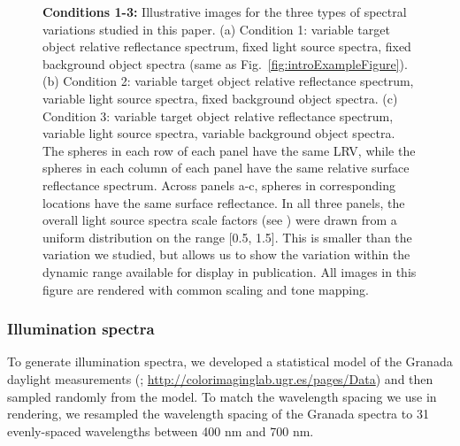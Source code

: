 \documentclass{jov}
\begin{document}
\begin{figure}
\begin{subfigure}{0.33 \textwidth}
        \label{fig:allSpectraVarying}
    \end{subfigure}    
    \caption{{\bf Conditions 1-3:} Illustrative images for the three types of spectral variations studied in this paper. (a) Condition 1: variable target object relative reflectance spectrum, fixed light source spectra, fixed background object spectra (same as Fig.~\ref{fig:introExampleFigure}). 
(b) Condition 2: variable target object relative reflectance spectrum, variable light source spectra, fixed background object spectra. (c) Condition 3: variable target object relative reflectance spectrum, variable light source spectra, variable background object spectra. The spheres in each row of each panel have the same LRV, while the spheres in each column of each panel have the same relative surface reflectance spectrum.  Across panels a-c, spheres in corresponding locations have the same surface reflectance. In all three panels, the overall light source spectra scale factors (see ) were drawn from a uniform distribution on the range [0.5, 1.5]. This is smaller than the variation we studied, but allows us to show the variation within the dynamic range available for display in publication. All images in this figure are rendered with common scaling and tone mapping.} 
\label{fig:studiedCases}
\end{figure}

\subsubsection{Illumination spectra}
To generate illumination spectra, we developed a statistical model of the Granada daylight measurements (; \href{http://colorimaginglab.ugr.es/pages/Data}{http://colorimaginglab.ugr.es/pages/Data}) and then sampled randomly from the model.
To match the wavelength spacing we use in rendering, we resampled the wavelength spacing of the Granada spectra to
31 evenly-spaced wavelengths between 400 nm and 700 nm.
\end{document}
